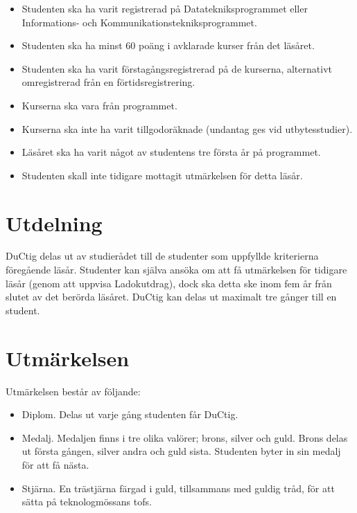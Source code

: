 \documentclass{dsekprotokoll}
\begin{document}
\begin{itemize}
  \item Studenten ska ha varit registrerad på Datatekniksprogrammet
    eller Informations- och
    Kommunikationstekniksprogrammet.
  \item Studenten ska ha minst 60 poäng i avklarade kurser från det läsåret.
  \item Studenten ska ha varit förstagångsregistrerad på de kurserna,
    alternativt omregistrerad från en förtidsregistrering.
  \item Kurserna ska vara från programmet.
  \item Kurserna ska inte ha varit tillgodoräknade (undantag ges vid
    utbytesstudier).
  \item Läsåret ska ha varit något av studentens tre första år på programmet.
  \item Studenten skall inte tidigare mottagit utmärkelsen för detta läsår.
\end{itemize}

\section{Utdelning}
DuCtig delas ut av studierådet till de studenter som uppfyllde
kriterierna föregående läsår. Studenter kan själva ansöka om att få
utmärkelsen för tidigare läsår (genom att uppvisa Ladokutdrag), dock
ska detta ske inom fem år från slutet av det berörda läsåret. DuCtig
kan delas ut
maximalt tre gånger till en student.

\section{Utmärkelsen}
Utmärkelsen består av följande:
\begin{itemize}
  \item Diplom. Delas ut varje gång studenten får DuCtig.
  \item Medalj. Medaljen finns i tre olika valörer; brons, silver och
    guld. Brons delas ut första
    gången, silver andra och guld sista. Studenten byter in sin
    medalj för att få nästa.
  \item Stjärna. En trästjärna färgad i guld, tillsammans med guldig
    tråd, för att sätta på teknologmössans tofs.
\end{itemize}
\end{document}
